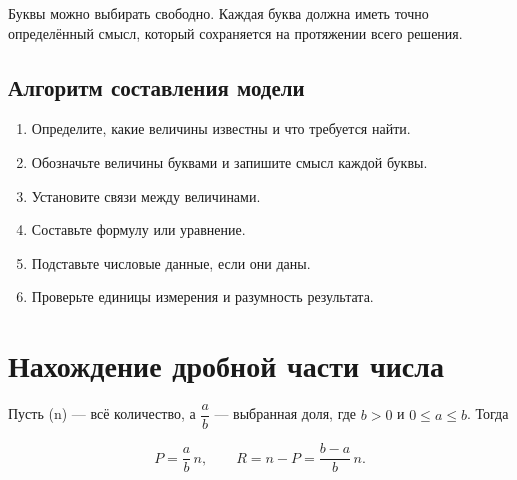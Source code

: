 \documentclass[a4paper,12pt]{article}
\begin{document}
Буквы можно выбирать свободно. Каждая буква должна иметь точно определённый смысл, который сохраняется на протяжении всего решения.

\begin{center}
\end{center}

\subsection{Алгоритм составления модели}

\begin{enumerate}
  \item Определите, какие величины известны и что требуется найти.
  \item Обозначьте величины буквами и запишите смысл каждой буквы.
  \item Установите связи между величинами.
  \item Составьте формулу или уравнение.
  \item Подставьте числовые данные, если они даны.
  \item Проверьте единицы измерения и разумность результата.
\end{enumerate}

\section{Нахождение дробной части числа}

Пусть (n) --- всё количество, а \(\dfrac{a}{b}\) --- выбранная доля, где \(b>0\) и \(0\le a\le b\). Тогда

\[
\boxed{P=\frac{a}{b}\,n},
\qquad
\boxed{R=n-P=\frac{b-a}{b}\,n}.
\]
\end{document}

